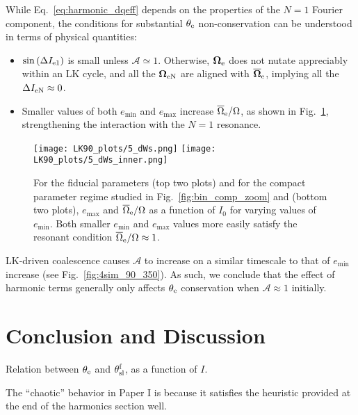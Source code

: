 \documentclass[
        twocolumn,
        twocolappendix
    ]{aastex63}
\renewcommand*{\bm}[1]{\boldsymbol{\mathbf{#1}}}
\newcommand*{\p}[1]{\left(#1\right)}
\begin{document}
While Eq.~\eqref{eq:harmonic_dqeff} depends on the properties of the $N = 1$
Fourier component, the conditions for substantial $\theta_{\rm e}$
non-conservation can be understood in terms of physical quantities:
\begin{itemize}
    \item $\sin \p{\Delta I_{\rm e1}}$ is small unless $\mathcal{A} \simeq
        1$. Otherwise, $\bm{\Omega}_{\rm e}$ does not nutate appreciably within
        an LK cycle, and all the $\bm{\Omega}_{\rm eN}$ are aligned with
        $\bm{\overline{\Omega}}_{\rm e}$, implying all the $\Delta I_{\rm eN} \approx
        0$.

    \item Smaller values of both $e_{\min}$ and $e_{\max}$ increase
        $\overline{\Omega}_{\rm e} / \Omega$, as shown in Fig.~\ref{fig:dWs},
        strengthening the interaction with the $N = 1$ resonance.
\end{itemize}
\begin{figure}
    \centering
    \texttt{[image: LK90\_plots/5\_dWs.png]}
    \texttt{[image: LK90\_plots/5\_dWs\_inner.png]}
    \caption{For the fiducial parameters (top two plots) and for the compact
    parameter regime studied in Fig.~\ref{fig:bin_comp_zoom} and \citet{bin1}
    (bottom two plots), $e_{\max}$ and $\overline{\Omega}_{\rm e} / \Omega$ as a
    function of $I_0$ for varying values of $e_{\min}$. Both smaller $e_{\min}$
    and $e_{\max}$ values more easily satisfy the resonant condition
    $\overline{\Omega}_{\rm e} / \Omega \approx 1$.}\label{fig:dWs}
\end{figure}

LK-driven coalescence causes $\mathcal{A}$ to increase on a similar
timescale to that of $e_{\min}$ increase (see Fig.~\ref{fig:4sim_90_350}). As
such, we conclude that the effect of harmonic terms generally only affects
$\theta_{\rm e}$ conservation when $\mathcal{A} \approx 1$ initially.

\section{Conclusion and Discussion}\label{s:discussion}

Relation between $\theta_{\rm e}$ and $\theta_{\rm sl}^{\rm f}$, as a function
of $I$.

The ``chaotic'' behavior in Paper I is because it satisfies the heuristic
provided at the end of the harmonics section well.
\end{document}

